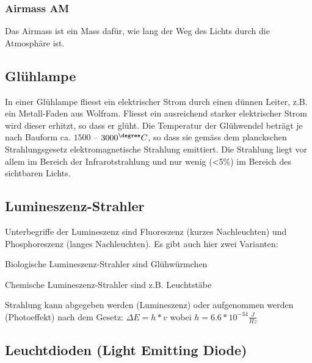 \subsubsection{Airmass AM}
Das Airmass ist ein Mass dafür, wie lang der Weg des Lichts durch die Atmosphäre ist.

\subsection{Glühlampe}
In einer Glühlampe fliesst ein elektrischer Strom durch einen dünnen Leiter, z.B. ein Metall-Faden aus Wolfram. Fliesst ein ausreichend starker elektrischer Strom wird dieser erhitzt, so dass er glüht. Die Temperatur der Glühwendel beträgt je nach Bauform ca. $1500$ – $3000^\degree C$, so dass sie gemäss dem planckschen Strahlungsgesetz elektromagnetische Strahlung emittiert. Die Strahlung liegt vor allem im Bereich der Infrarotstrahlung und nur wenig (\textless5\%) im Bereich des sichtbaren Lichts.

\subsection{Lumineszenz-Strahler}
Unterbegriffe der Lumineszenz sind Fluoreszenz (kurzes Nachleuchten) und Phosphoreszenz (langes Nachleuchten). Es gibt auch hier zwei Varianten:
\begin{compactitem}
    \item Biologische Lumineszenz-Strahler sind Glühwürmchen
    \item Chemische Lumineszenz-Strahler sind z.B. Leuchtstäbe
\end{compactitem}
Strahlung kann abgegeben werden (Lumineszenz) oder aufgenommen werden (Photoeffekt) nach dem Gesetz: $\Delta E = h*v$ wobei $h = 6.6*10^{-34} \frac{J}{Hz}$

\subsection{Leuchtdioden (Light Emitting Diode)}
